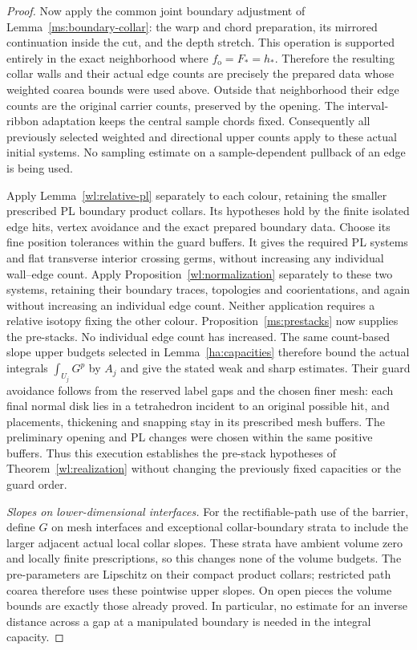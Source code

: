\begin{proof}
Now apply the common joint boundary adjustment of
Lemma~\ref{ms:boundary-collar}: the warp and chord preparation,
its mirrored continuation inside the cut, and the depth stretch.
This operation is supported entirely in the exact neighborhood
where $f_{\mathrm o}=F_*=h_*$.  Therefore the resulting collar
walls and their actual edge counts are precisely the prepared
data whose weighted coarea bounds were used above.  Outside that
neighborhood their edge counts are the original carrier counts,
preserved by the opening.  The interval-ribbon adaptation keeps
the central sample chords fixed.  Consequently all previously
selected weighted and directional upper counts apply to these
actual initial systems.  No sampling estimate on a
sample-dependent pullback of an edge is being used.

Apply Lemma~\ref{wl:relative-pl} separately to each colour,
retaining the smaller prescribed PL boundary product collars.
Its hypotheses hold by the finite isolated edge hits, vertex
avoidance and the exact prepared boundary data.  Choose its fine
position tolerances within the guard buffers.  It gives the
required PL systems and flat transverse interior crossing germs,
without increasing any individual wall--edge count.  Apply
Proposition~\ref{wl:normalization} separately to these two systems,
retaining their boundary traces, topologies and coorientations,
and again without increasing an individual edge count.  Neither
application requires a relative isotopy fixing the other colour.
Proposition~\ref{ms:prestacks} now supplies the pre-stacks.
No individual edge count has increased.  The same count-based
slope upper budgets selected in Lemma~\ref{ha:capacities} therefore
bound the actual integrals $\int_{U_j}G^p$ by $A_j$ and give the
stated weak and sharp estimates.  Their guard avoidance follows from the
reserved label gaps and the chosen finer mesh: each final normal
disk lies in a tetrahedron incident to an original possible hit,
and placements, thickening and snapping stay in its prescribed
mesh buffers.  The preliminary opening and PL changes were chosen
within the same positive buffers.  Thus this execution establishes
the pre-stack hypotheses of Theorem~\ref{wl:realization} without
changing the previously fixed capacities or the guard order.

\emph{Slopes on lower-dimensional interfaces.}
For the rectifiable-path use of the barrier, define $G$ on mesh
interfaces and exceptional collar-boundary strata to include the
larger adjacent actual local collar slopes.  These strata have
ambient volume zero and locally finite prescriptions, so this
changes none of the volume budgets.  The pre-parameters are
Lipschitz on their compact product collars; restricted path coarea
therefore uses these pointwise upper slopes.  On open pieces the
volume bounds are exactly those already proved.  In particular,
no estimate for an inverse distance across a gap at a manipulated
boundary is needed in the integral capacity.
\end{proof}

